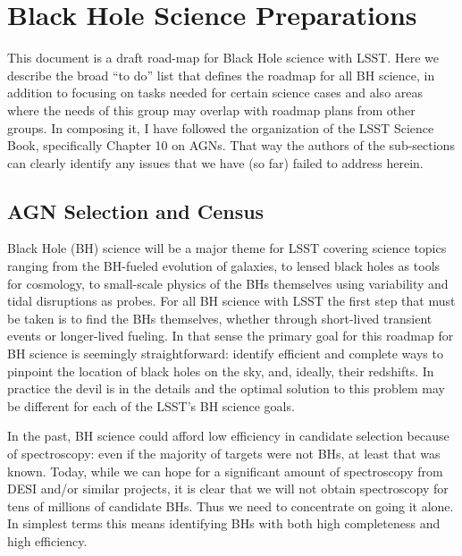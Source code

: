 

\section{Black Hole Science Preparations}\label{sec:tasks:agn:task_list}  

This document is a draft road-map for Black Hole science with LSST.  Here we describe the broad ``to do'' list that defines the roadmap for all BH science, in addition to focusing on tasks needed for certain science cases and also areas where the needs of this group may overlap with roadmap plans from other groups.  In composing it, I have followed the organization of the LSST Science Book, specifically Chapter 10 on AGNs.  That way the authors of the sub-sections can clearly identify any issues that we have (so far) failed to address herein.

\subsection{AGN Selection and Census}

Black Hole (BH) science will be a major theme for LSST covering science topics ranging from the BH-fueled evolution of galaxies, to lensed black holes as tools for cosmology, to small-scale physics of the BHs themselves using variability and tidal disruptions as probes.  For all BH science with LSST the first step that must be taken is to find the BHs themselves, whether through short-lived transient events or longer-lived fueling.  In that sense the primary goal for this roadmap for BH science is seemingly straightforward: identify efficient and complete ways to pinpoint the location of black holes on the sky, and, ideally, their redshifts.  In practice the devil is in the details and the optimal solution to this problem may be different for each of the LSST's BH science goals.

In the past, BH science could afford low efficiency in candidate
selection because of spectroscopy: even if the majority of targets
were not BHs, at least that was known.  Today, while we can hope for a
significant amount of spectroscopy from DESI and/or similar projects,
it is clear that we will not obtain spectroscopy for tens of millions
of candidate BHs.  Thus we need to concentrate on going it alone. In
simplest terms this means identifying BHs with both high completeness
and high efficiency.

